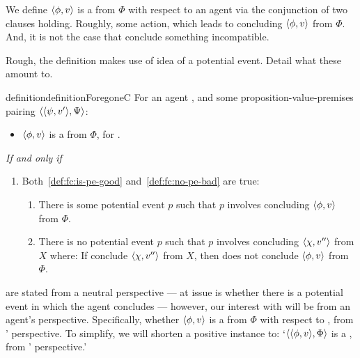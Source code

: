 \begin{note}
  We define \(\langle \phi, v \rangle\) is a \emph{} from \(\Phi\) with respect to an agent via the conjunction of two clauses holding.
  Roughly, some action, which leads to concluding \(\langle \phi, v \rangle\) from \(\Phi\).
  And, it is not the case that conclude something incompatible.

  Rough, the definition makes use of idea of a potential event.
  Detail what these amount to.

  \begin{restatable}[A \fc{0}]{definition}{definitionForegoneC}
    \label{def:fc}
    For an agent \vAgent{}, and some proposition-value-premises pairing \(\langle \langle \psi, v' \rangle, \Psi \rangle\):

    \begin{itemize}
    \item
      \(\langle \phi, v \rangle\) is a \emph{} from \(\Phi\), for \vAgent{}.
    \end{itemize}
    \emph{If and only if}
    \begin{enumerate}[label=]
    \item
      Both~\ref{def:fc:is-pe-good} and~\ref{def:fc:no-pe-bad} are true:
      \begin{enumerate}[label=\alph*., ref=(\alph*)]
      \item
        \label{def:fc:is-pe-good}
        There is some potential event \(p\) such that \(p\) involves \vAgent{} concluding \(\langle \phi, v \rangle\) from \(\Phi\).
      \item
        \label{def:fc:no-pe-bad}
        There is no potential event \(p\) such that \(p\) involves \vAgent{} concluding
        \(\langle \chi, v'' \rangle\) from \(X\) where:
        If conclude \(\langle \chi, v'' \rangle\) from \(X\), then does not conclude \(\langle \phi, v \rangle\) from \(\Phi\).
      \end{enumerate}
    \end{enumerate}
    \vspace{-\baselineskip}
  \end{restatable}

   are stated from a neutral perspective --- at issue is whether there is a potential event in which the agent concludes --- however, our interest with  will be from an agent's perspective.
  Specifically, whether \(\langle \phi, v \rangle\) is a  from \(\Phi\) with respect to \vAgent{}, from \vAgent{}' perspective.
  To simplify, we will shorten a positive instance to:
  `\(\langle \langle \phi, v \rangle, \Phi \rangle\) is a , from \vAgent{}' perspective.'
\end{note}

